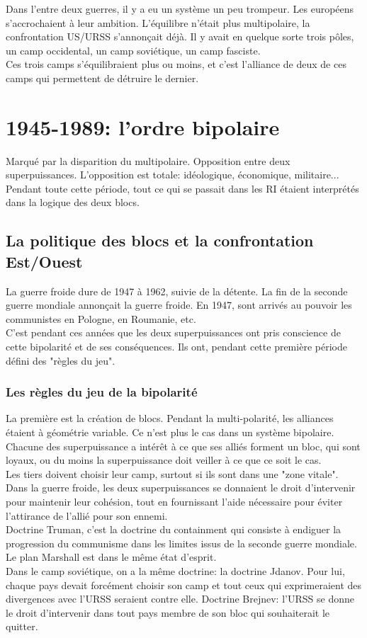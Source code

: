 \documentclass[10pt, a4paper, openany]{book}
\begin{document}
Dans l'entre deux guerres, il y a eu un système un peu trompeur. Les européens s'accrochaient à leur ambition. L'équilibre n'était plus multipolaire, la confrontation US/URSS s'annonçait déjà. Il y avait en quelque sorte trois pôles, un camp occidental, un camp soviétique, un camp fasciste. \\
Ces trois camps s'équilibraient plus ou moins, et c'est l'alliance de deux de ces camps qui permettent de détruire le dernier. 


\section{1945-1989: l'ordre bipolaire}

Marqué par la disparition du multipolaire. Opposition entre deux superpuissances. L'opposition est totale: idéologique, économique, militaire... \\
Pendant toute cette période, tout ce qui se passait dans les RI étaient interprétés dans la logique des deux blocs. 

\subsection{La politique des blocs et la confrontation Est/Ouest}

La guerre froide dure de 1947 à 1962, suivie de la détente. La fin de la seconde guerre mondiale annonçait la guerre froide. En 1947, sont arrivés au pouvoir les communistes en Pologne, en Roumanie, etc. \\
C'est pendant ces années que les deux superpuissances ont pris conscience de cette bipolarité et de ses conséquences. Ils ont, pendant cette première période défini des "règles du jeu". 


\subsubsection{Les règles du jeu de la bipolarité}

La première est la création de blocs. Pendant la multi-polarité, les alliances étaient à géométrie variable. Ce n'est plus le cas dans un système bipolaire. Chacune des superpuissance a intérêt à ce que ses alliés forment un bloc, qui sont loyaux, ou du moins la superpuissance doit veiller à ce que ce soit le cas. \\
Les tiers doivent choisir leur camp, surtout si ils sont dans une "zone vitale". Dans la guerre froide, les deux superpuissances se donnaient le droit d'intervenir pour maintenir leur cohésion, tout en fournissant l'aide nécessaire pour éviter l'attirance de l'allié pour son ennemi. \\
Doctrine Truman, c'est la doctrine du containment qui consiste à endiguer la progression du communisme dans les limites issus de la seconde guerre mondiale. Le plan Marshall est dans le même état d'esprit. \\
Dans le camp soviétique, on a la même doctrine: la doctrine Jdanov. Pour lui, chaque pays devait forcément choisir son camp et tout ceux qui exprimeraient des divergences avec l'URSS seraient contre elle. Doctrine Brejnev: l'URSS se donne le droit d'intervenir dans tout pays membre de son bloc qui souhaiterait le quitter.
\end{document}
